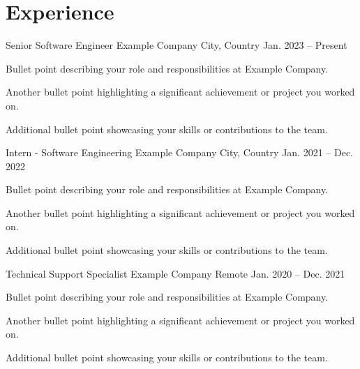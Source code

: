 \section{Experience}

\resumeEntry
    {Senior Software Engineer}
    {Example Company}
    {City, Country}
    {Jan. 2023 -- Present}
\begin{resumeBullets}
    \item Bullet point describing your role and responsibilities at Example Company.
    \item Another bullet point highlighting a significant achievement or project you worked on.
    \item Additional bullet point showcasing your skills or contributions to the team.
\end{resumeBullets}

\resumeEntry
    {Intern - Software Engineering}
    {Example Company}
    {City, Country}
    {Jan. 2021 -- Dec. 2022}
\begin{resumeBullets}
    \item Bullet point describing your role and responsibilities at Example Company.
    \item Another bullet point highlighting a significant achievement or project you worked on.
    \item Additional bullet point showcasing your skills or contributions to the team.
\end{resumeBullets}

\resumeEntry
    {Technical Support Specialist}
    {Example Company}
    {Remote}
    {Jan. 2020 -- Dec. 2021}
\begin{resumeBullets}
    \item Bullet point describing your role and responsibilities at Example Company.
    \item Another bullet point highlighting a significant achievement or project you worked on.
    \item Additional bullet point showcasing your skills or contributions to the team.
\end{resumeBullets}
